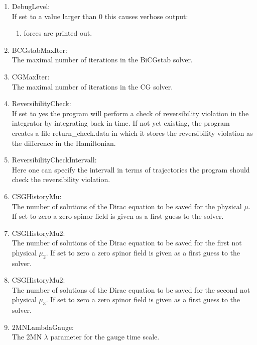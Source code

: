 \begin{enumerate}
\item {\ttfamily DebugLevel}:\\
  If set to a value larger than $0$ this causes verbose output:
  \begin{enumerate}
  \item forces are printed out.
  \end{enumerate}

\item {\ttfamily BCGstabMaxIter}:\\
  The maximal number of iterations in the BiCGstab solver.

\item {\ttfamily CGMaxIter}:\\
  The maximal number of iterations in the CG solver.

\item {\ttfamily ReversibilityCheck}:\\
  If set to {\ttfamily yes} the program will perform a check of
  reversibility violation in the integrator by integrating back in
  time. If not yet existing, the program creates a file {\ttfamily
    return\_check.data} in which it stores the reversibility violation
  as the difference in the Hamiltonian.

\item {\ttfamily ReversibilityCheckIntervall}:\\
  Here one can specify the intervall in terms of trajectories the
  program should check the reversibility violation.

\item {\ttfamily CSGHistoryMu}:\\
  The number of solutions of the Dirac equation to be saved for the
  physical $\mu$. If set to zero a zero spinor field is given as a
  first guess to the solver.
  
\item {\ttfamily CSGHistoryMu2}:\\
  The number of solutions of the Dirac equation to be saved for the
  first not physical $\mu_2$. If set to zero a zero spinor field is
  given as a first guess to the solver. 
 
\item {\ttfamily CSGHistoryMu2}:\\
  The number of solutions of the Dirac equation to be saved for the
  second not physical $\mu_3$. If set to zero a zero spinor field is
  given as a first guess to the solver.
  
\item {\ttfamily 2MNLambdaGauge}:\\
  The 2MN $\lambda$ parameter for the gauge time scale.


\end{enumerate}
